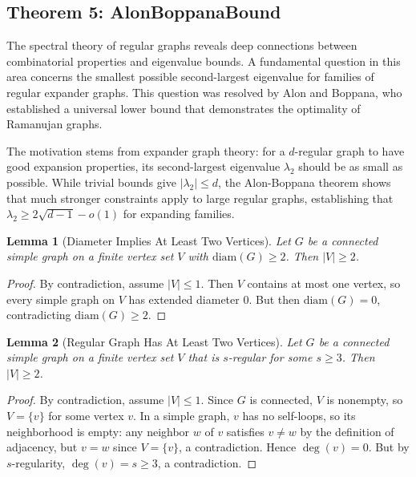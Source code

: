 \documentclass[11pt]{article}
\theoremstyle{plain}
\newtheorem*{lemma}{Lemma}
\theoremstyle{definition}
\theoremstyle{remark}
\begin{document}
\vspace{1em}

\subsection{Theorem 5: AlonBoppanaBound}

The spectral theory of regular graphs reveals deep connections between combinatorial properties and eigenvalue bounds. A fundamental question in this area concerns the smallest possible second-largest eigenvalue for families of regular expander graphs. This question was resolved by Alon and Boppana, who established a universal lower bound that demonstrates the optimality of Ramanujan graphs.

The motivation stems from expander graph theory: for a $d$-regular graph to have good expansion properties, its second-largest eigenvalue $\lambda_2$ should be as small as possible. While trivial bounds give $|\lambda_2| \leq d$, the Alon-Boppana theorem shows that much stronger constraints apply to large regular graphs, establishing that $\lambda_2 \geq 2\sqrt{d-1} - o(1)$ for expanding families.

\begin{lemma}[Diameter Implies At Least Two Vertices]
Let $G$ be a connected simple graph on a finite vertex set $V$ with $\text{diam}(G) \geq 2$. Then $|V| \geq 2$.
\end{lemma}

\begin{proof}
By contradiction, assume $|V| \leq 1$. Then $V$ contains at most one vertex, so every simple graph on $V$ has extended diameter $0$. But then $\text{diam}(G) = 0$, contradicting $\text{diam}(G) \geq 2$.
\end{proof}

\begin{lemma}[Regular Graph Has At Least Two Vertices]
Let $G$ be a connected simple graph on a finite vertex set $V$ that is $s$-regular for some $s \geq 3$. Then $|V| \geq 2$.
\end{lemma}

\begin{proof}
By contradiction, assume $|V| \leq 1$. Since $G$ is connected, $V$ is nonempty, so $V = \{v\}$ for some vertex $v$. In a simple graph, $v$ has no self-loops, so its neighborhood is empty: any neighbor $w$ of $v$ satisfies $v \neq w$ by the definition of adjacency, but $v = w$ since $V = \{v\}$, a contradiction. Hence $\deg(v) = 0$. But by $s$-regularity, $\deg(v) = s \geq 3$, a contradiction.
\end{proof}
\end{document}
